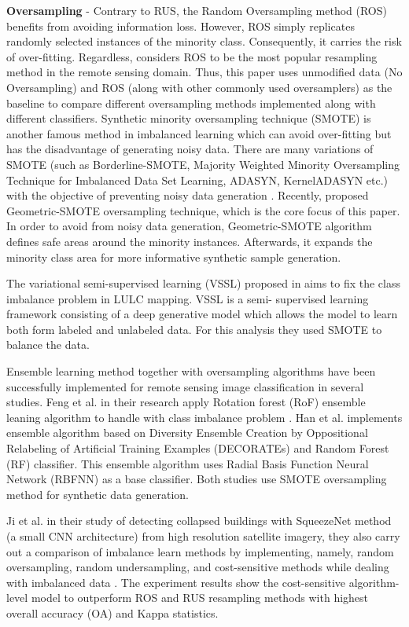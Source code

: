 \documentclass[parskip=full]{scrartcl}
\begin{document}
\textbf{Oversampling} - Contrary to RUS, the Random Oversampling method (ROS)
benefits from avoiding information loss. However, ROS simply replicates
randomly selected instances of the minority class. Consequently, it carries the
risk of over-fitting. Regardless, \cite{Feng2019}
considers ROS to be the most popular resampling method in the remote sensing
domain. Thus, this paper uses unmodified data (No Oversampling) and ROS (along
with other commonly used oversamplers) as the baseline to compare different
oversampling methods implemented along with different classifiers. Synthetic
minority oversampling technique (SMOTE) is another famous method in imbalanced
learning which can avoid over-fitting but has the disadvantage of generating
noisy data. There are many variations of SMOTE (such as Borderline-SMOTE,
Majority Weighted Minority Oversampling Technique for Imbalanced Data Set
Learning, ADASYN, KernelADASYN etc.) with the objective of preventing noisy
data generation \cite{Feng2019}. Recently, \cite{Douzas2019}
proposed Geometric-SMOTE oversampling technique, which is the core focus of
this paper. In order to avoid from noisy data generation, Geometric-SMOTE
algorithm defines safe areas around the minority instances. Afterwards, it
expands the minority class area for more informative synthetic sample
generation.

The variational semi-supervised learning (VSSL) proposed in \cite{Cenggoro2018}
aims to fix the class imbalance problem in LULC mapping. VSSL is a semi-
supervised learning framework consisting of a deep generative model which
allows the model to learn both form labeled and unlabeled data. For this
analysis they used SMOTE to balance the data.

Ensemble learning method together with oversampling algorithms have been
successfully implemented for remote sensing image classification in several
studies. Feng et al. in their research apply Rotation forest (RoF) ensemble
leaning algorithm to handle with class imbalance problem \cite{Feng2019}. Han
et al. \cite{Han2012} implements ensemble algorithm based on Diversity Ensemble
Creation by Oppositional Relabeling of Artificial Training Examples (DECORATEs)
and Random Forest (RF) classifier. This ensemble algorithm uses Radial Basis
Function Neural Network (RBFNN) as a base classifier. Both studies use SMOTE
oversampling method for synthetic data generation.

Ji et al. in their study of detecting collapsed buildings with SqueezeNet method
(a small CNN architecture) from high resolution satellite imagery, they also
carry out a comparison of imbalance learn methods by implementing, namely,
random oversampling, random undersampling, and cost-sensitive methods while
dealing with imbalanced data \cite{Ji2018}. The experiment results show the
cost-sensitive algorithm-level model to outperform ROS and RUS resampling
methods with highest overall accuracy (OA) and Kappa statistics.
\end{document}
